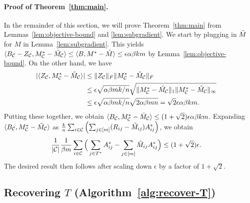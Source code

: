 \paragraph{Proof of Theorem~\ref{thm:main}.}
In the remainder of this section, we will prove Theorem~\ref{thm:main} from 
Lemmas~\ref{lem:objective-bound} and \ref{lem:subgradient}.
We start by plugging in $\tilde{M}$ for $M$ in Lemma~\ref{lem:subgradient}. This yields
$\langle B_{\mathcal{C}} - Z_{\mathcal{C}}, M^*_{\mathcal{C}} - \tilde{M}_{\mathcal{C}} \rangle \leq \langle B, M^* - \tilde{M} \rangle \leq \epsilon \alpha\beta km$
by Lemma~\ref{lem:objective-bound}.
On the other hand, we have 
\begin{align}
|\langle Z_{\mathcal{C}}, M^*_{\mathcal{C}} - \tilde{M}_{\mathcal{C}} \rangle| &\leq \|Z_{\mathcal{C}}\|_F\|M^*_{\mathcal{C}} - \tilde{M}_{\mathcal{C}}\|_F \\
 &\leq \epsilon\sqrt{\alpha\beta mk/n} \sqrt{\|M^*_{\mathcal{C}} - \tilde{M}_{\mathcal{C}}\|_{1}\|M^*_{\mathcal{C}} - \tilde{M}_{\mathcal{C}}\|_{\infty}} \\
 &\leq \epsilon\sqrt{\alpha\beta mk/n} \sqrt{2\alpha\beta mn} = \sqrt{2}\epsilon\alpha\beta km.
\end{align}
Putting these together, we obtain
$\langle B_{\mathcal{C}}, M^*_{\mathcal{C}} - \tilde{M}_{\mathcal{C}} \rangle \leq (1+\sqrt{2})\epsilon \alpha\beta km$.
Expanding $\langle B_{\mathcal{C}}, M^*_{\mathcal{C}} - \tilde{M}_{\mathcal{C}} \rangle$ as 
$\frac{k}{n}\sum_{i \in \mathcal{C}}\left( \sum_{j \in [m]} (R_{ij} - \tilde{M}_{ij})A^*_{ij} \right)$,
we obtain 
\[ \frac{1}{|\mathcal{C}|}\frac{1}{\beta m}\sum_{i \in \mathcal{C}}\Big(\sum_{j \in T^*} A^*_{ij} - \sum_{j \in [m]} \tilde{M}_{ij}A^*_{ij}\Big) \leq (1+\sqrt{2})\epsilon. \]
The desired result then follows after scaling down $\epsilon$ 
by a factor of $1+\sqrt{2}$.

\subsection{Recovering $T$ (Algorithm~\ref{alg:recover-T})}
\label{sec:approach-T}
\label{sec:rounding}

